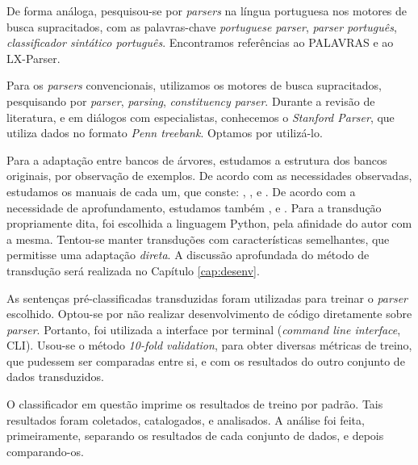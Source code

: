 De forma análoga, pesquisou-se por \textit{parsers} na língua portuguesa nos motores de busca supracitados, com as palavras-chave \textit{portuguese parser}, \textit{parser português}, \textit{classificador sintático português}. Encontramos referências ao PALAVRAS e ao LX-Parser.

Para os \textit{parsers} convencionais, utilizamos os motores de busca supracitados, pesquisando por \textit{parser}, \textit{parsing}, \textit{constituency parser}. Durante a revisão de literatura, e em diálogos com especialistas, conhecemos o \textit{Stanford Parser}, que utiliza dados no formato \textit{Penn treebank}. Optamos por utilizá-lo.

Para a adaptação entre bancos de árvores, estudamos a estrutura dos bancos originais, por observação de exemplos. De acordo com as necessidades observadas, estudamos os manuais de cada um, que conste: , ,  e . De acordo com a necessidade de aprofundamento, estudamos também ,  e . Para a transdução propriamente dita, foi escolhida a linguagem Python, pela afinidade do autor com a mesma. Tentou-se manter transduções com características semelhantes, que permitisse uma adaptação \textit{direta}. 
A discussão aprofundada do método de transdução será realizada no Capítulo \ref{cap:desenv}.

As sentenças pré-classificadas transduzidas foram utilizadas para treinar o \textit{parser} escolhido. Optou-se por não realizar desenvolvimento de código diretamente sobre \textit{parser}. Portanto, foi utilizada a interface por terminal (\textit{command line interface}, CLI). Usou-se o método \textit{10-fold validation}, para obter diversas métricas de treino, que pudessem ser comparadas entre si, e com os resultados do outro conjunto de dados transduzidos.

O classificador em questão imprime os resultados de treino por padrão. Tais resultados foram coletados, catalogados, e analisados. A análise foi feita, primeiramente, separando os resultados de cada conjunto de dados, e depois comparando-os.